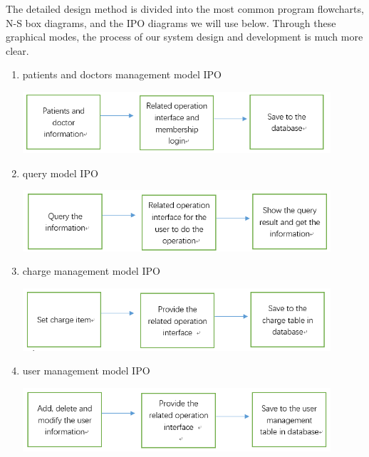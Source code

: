The detailed design method is divided into the most common program flowcharts, N-S box diagrams, and the IPO diagrams we will use below. Through these graphical modes, the process of our system design and development is much more clear.
\begin{enumerate}
    \item patients and doctors management model IPO
    
    \includegraphics[width=0.9\textwidth]{2.png}
    
    \item query model IPO
    
    \includegraphics[width=0.9\textwidth]{3.png}

    \item charge management model IPO
    
    \includegraphics[width=0.9\textwidth]{4.png}

    \item user management model IPO
    
    \includegraphics[width=0.9\textwidth]{5.png}

\end{enumerate}
